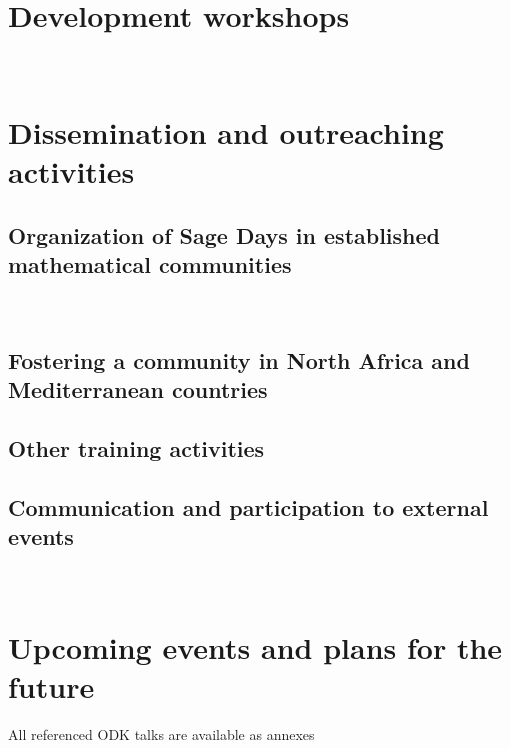 \documentclass{../../Proposal/LaTeX-proposal/deliverablereport}
\author{Viviane Pons}
\begin{document}
\maketitle
\githubissuedescription


\section{Development workshops}
~










\section{Dissemination and outreaching activities}

\subsection{Organization of Sage Days in established mathematical communities}
~





\subsection{Fostering a community in North Africa and Mediterranean countries}

\subsection{Other training activities}

\subsection{Communication and participation to external events}
~

















\section{Upcoming events and plans for the future}




\footnotesize{All referenced ODK talks are available as annexes}
\end{document}

